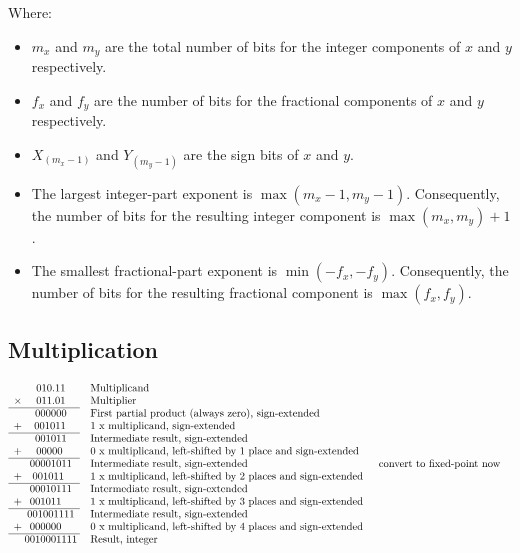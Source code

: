 \documentclass[12pt,openany, tikz,border=10pt]{book}
\begin{document}
Where:
\begin{itemize}
    \item[] $m_x$ and $m_y$ are the total number of bits for the integer components of $x$ and $y$ respectively.
    \item[] $f_x$ and $f_y$ are the number of bits for the fractional components of $x$ and $y$ respectively.
    \item[] $X_{(m_x-1)}$ and $Y_{(m_y-1)}$ are the sign bits of $x$ and $y$.
    \item[] The largest integer-part exponent is $\max(m_x - 1, m_y - 1)$. Consequently, the number of bits for the resulting integer component is $\max(m_x, m_y) + 1$.
    \item[] The smallest fractional-part exponent is $\min(-f_x, -f_y)$. Consequently, the number of bits for the resulting fractional component is $\max(f_x, f_y)$.
\end{itemize}

\subsection{Multiplication}


\begin{align*}
    \begin{array}{r@{}c@{}l}
        & 010.11 & \text{\quad Multiplicand} \\
      \times & 011.01 & \text{\quad Multiplier} \\ \cline{1-2}
        & 000000 & \text{\quad First partial product (always zero), sign-extended} \\ 
      + & \; \; \; \; 001011\phantom{.00} & \text{\quad 1 x multiplicand, sign-extended} \\ \cline{1-2}
        & 001011 & \text{\quad Intermediate result, sign-extended} \\ 
      + & \phantom{0}00000\phantom{.0} & \text{\quad 0 x multiplicand, left-shifted by 1 place and sign-extended} \\ \cline{1-2}
        & 00001011\phantom{} & \text{\quad Intermediate result, sign-extended} \\ 
      + & \phantom{00}001011\phantom{000} & \text{\quad 1 x multiplicand, left-shifted by 2 places and sign-extended} \\ \cline{1-2}
        & 00010111 & \text{\quad Intermediate result, sign-extended} \\ 
      + & 001011\phantom{00} & \text{\quad 1 x multiplicand, left-shifted by 3 places and sign-extended} \\ \cline{1-2}
        & 001001111 & \text{\quad Intermediate result, sign-extended} \\ 
      + & 000000\phantom{00}& \text{\quad 0 x multiplicand, left-shifted by 4 places and sign-extended} \\ \cline{1-2}
        & 0010001111 & \text{\quad Result, integer} \\
    \end{array} & \text{\quad convert to fixed-point now}
 \end{align*}
\end{document}
